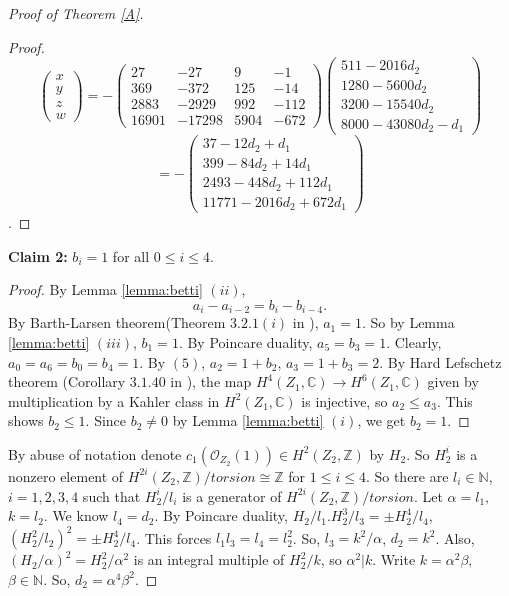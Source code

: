 \documentclass{article}
\begin{document}
\begin{proof}[Proof of Theorem \ref{A}]
\begin{proof}
$$\begin{pmatrix}
    x \\
    y \\
    z \\
    w
\end{pmatrix}=-\begin{pmatrix}
    27 & -27 & 9 & -1 \\
    369 & -372 & 125 & -14 \\
    2883 & -2929 & 992 & -112 \\
    16901 & -17298 & 5904 & -672
\end{pmatrix}\begin{pmatrix}
    511-2016d_2 \\
    1280-5600d_2 \\
    3200-15540d_2 \\
    8000-43080d_2-d_1
\end{pmatrix}$$ $$=-\begin{pmatrix}
    37-12d_2+d_1 \\
    399-84d_2+14d_1 \\
    2493-448d_2+112d_1 \\
    11771-2016d_2+672d_1
\end{pmatrix}$$.
\end{proof}
\textbf{Claim 2:}
 $b_i=1$ for all $0\leq i \leq 4$.
 \begin{proof}
     By Lemma \ref{lemma:betti} $(ii)$,
     \begin{equation}
         a_i-a_{i-2}=b_i-b_{i-4}.
     \end{equation}
     By Barth-Larsen theorem(Theorem $3.2.1(i)$ in \cite{lazarsfeld2017positivity}), $a_1=1$. So by Lemma \ref{lemma:betti} $(iii)$, $b_1=1$. By Poincare duality, $a_5=b_3=1$. Clearly, $a_0=a_6=b_0=b_4=1.$ By $(5)$, $a_2=1+b_2$, $a_3=1+b_3=2$. By Hard Lefschetz theorem (Corollary $3.1.40$ in \cite{lazarsfeld2017positivity}), the map $H^4(Z_1,\mathbb{C})\to H^6(Z_1,\mathbb{C})$ given by multiplication by a Kahler class in $H^2(Z_1,\mathbb{C})$ is injective, so $a_2\leq a_3$. This shows $b_2\leq 1.$ Since $b_2\neq 0$ by Lemma \ref{lemma:betti} $(i)$, we get $b_2=1$.
 \end{proof}

 By abuse of notation denote $c_1(\mathcal{O}_{Z_2}(1))\in H^2(Z_2,\mathbb{Z})$ by $H_2$. So $H_2^i$ is a nonzero element of $H^{2i}(Z_2,\mathbb{Z})/torsion\cong \mathbb{Z} $ for $1\leq i\leq 4.$ So there are $l_i\in \mathbb{N}$, $i=1,2,3,4$ such that $H_2^i/l_i$ is a generator of $H^{2i}(Z_2,\mathbb{Z})/torsion$. Let $\alpha=l_1,$ $k=l_2$. We know $l_4=d_2$. By Poincare duality, $H_2/l_1 . H_2^3/l_3=\pm H_2^4/l_4$, $(H_2^2/l_2)^2=\pm H_2^4/l_4$. This forces $l_1 l_3=l_4=l_2^2$. So, $l_3=k^2/\alpha$, $d_2=k^2$. Also, $(H_2/\alpha)^2=H_2^2/\alpha^2$ is an integral multiple of $H_2^2/k$, so $\alpha^2|k$. Write $k=\alpha^2\beta,$ $\beta\in \mathbb{N}$. So, $d_2=\alpha^4\beta^2$.
 

\end{proof}
\end{document}
